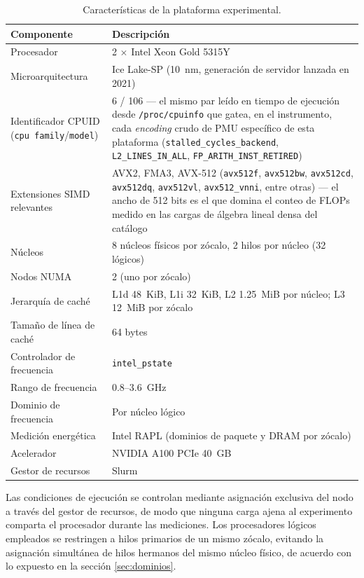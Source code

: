 \documentclass[12pt,oneside,spanish]{book}
\begin{document}
\begin{table}[H]
\centering
\caption[Características de la plataforma experimental]{Características de la plataforma experimental.}
\label{tab:plataforma}
\begin{tabular}{@{}ll@{}}
\toprule
\textbf{Componente} & \textbf{Descripción} \\
\midrule
Procesador & 2 $\times$ Intel Xeon Gold 5315Y \\
Microarquitectura & Ice Lake-SP (10~nm, generación de servidor lanzada en 2021) \\
Identificador CPUID (\texttt{cpu family}/\texttt{model}) & 6 / 106 --- el mismo par leído en tiempo de ejecución desde \texttt{/proc/cpuinfo} que gatea, en el instrumento, cada \textit{encoding} crudo de PMU específico de esta plataforma (\texttt{stalled\_cycles\_backend}, \texttt{L2\_LINES\_IN\_ALL}, \texttt{FP\_ARITH\_INST\_RETIRED}) \\
Extensiones SIMD relevantes & AVX2, FMA3, AVX-512 (\texttt{avx512f}, \texttt{avx512bw}, \texttt{avx512cd}, \texttt{avx512dq}, \texttt{avx512vl}, \texttt{avx512\_vnni}, entre otras) --- el ancho de 512 bits es el que domina el conteo de FLOPs medido en las cargas de álgebra lineal densa del catálogo \\
Núcleos & 8 núcleos físicos por zócalo, 2 hilos por núcleo (32 lógicos) \\
Nodos NUMA & 2 (uno por zócalo) \\
Jerarquía de caché & L1d 48~KiB, L1i 32~KiB, L2 1.25~MiB por núcleo; L3 12~MiB por zócalo \\
Tamaño de línea de caché & 64 bytes \\
Controlador de frecuencia & \texttt{intel\_pstate} \\
Rango de frecuencia & 0.8--3.6~GHz \\
Dominio de frecuencia & Por núcleo lógico \\
Medición energética & Intel RAPL (dominios de paquete y DRAM por zócalo) \\
Acelerador & NVIDIA A100 PCIe 40~GB \\
Gestor de recursos & Slurm \\
\bottomrule
\end{tabular}
\end{table}

Las condiciones de ejecución se controlan mediante asignación exclusiva del nodo a través del gestor de recursos, de modo que ninguna carga ajena al experimento comparta el procesador durante las mediciones. Los procesadores lógicos empleados se restringen a hilos primarios de un mismo zócalo, evitando la asignación simultánea de hilos hermanos del mismo núcleo físico, de acuerdo con lo expuesto en la sección \ref{sec:dominios}.
\end{document}
